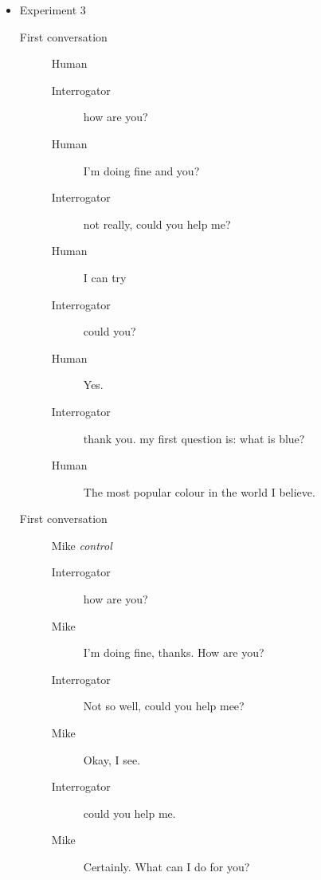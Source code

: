 \begin{itemize}
\begin{description}
\begin{description}
               \item [Interrogator] which university?
               \item [Mike] University of Illinois at Urbana-Champaign.
               \item [Interrogator] what do you like about teaching english?
               \item [Mike] Hmmm. Does that really interest you?
               \item [Interrogator] yes
               \item [Mike] All right! What are the things we can do to help disabled people?
            \end{description}
      \end{description}


   \item Experiment 3
      \begin{description}
         \item [First conversation] Human
            \begin{description}
               \item [Interrogator] how are you?
               \item [Human] I'm doing fine and you?
               \item [Interrogator] not really, could you help me?
               \item [Human] I can try
               \item [Interrogator] could you?
               \item [Human] Yes.
               \item [Interrogator] thank you. my first question is: what is blue?
               \item [Human] The most popular colour in the world I believe.
            \end{description}
         \item [First conversation] Mike \textit{control}
            \begin{description}
               \item [Interrogator] how are you?
               \item [Mike] I'm doing fine, thanks. How are you?
               \item [Interrogator] Not so well, could you help mee?
               \item [Mike] Okay, I see.
               \item [Interrogator] could you help me.
               \item [Mike] Certainly. What can I do for you?

\end{description}
\end{description}
\end{itemize}
